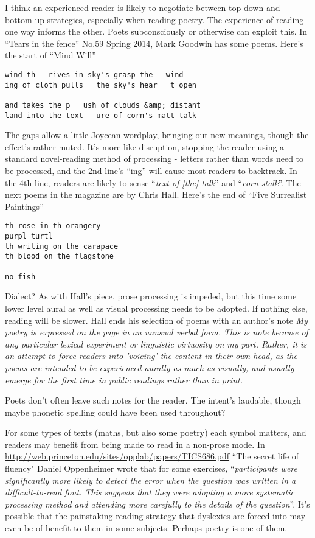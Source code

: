 \documentclass[11pt]{article}
\begin{document}
I think an experienced reader is likely to negotiate between top-down and bottom-up strategies, especially when reading poetry. The experience of reading one way informs the other. Poets subconsciously or otherwise can exploit this. In ``Tears in the fence'' No.59 Spring 2014, Mark Goodwin has some poems. Here's the start of ``Mind Will''
\begin{verbatim}
wind th   rives in sky's grasp the   wind
ing of cloth pulls   the sky's hear   t open

and takes the p   ush of clouds &amp; distant
land into the text   ure of corn's matt talk
\end{verbatim}

The gaps allow a little Joycean wordplay, bringing out new meanings, though the effect's rather muted. It's more like disruption, stopping the reader using a standard novel-reading method of processing - letters rather than words need to be processed, and the 2nd line's ``ing'' will cause most readers to backtrack. In the 4th line, readers are likely to sense ``\textit{text of [the] talk}'' and ``\textit{corn stalk}''. The next poems in the magazine are by Chris Hall. Here's the end of ``Five Surrealist Paintings''
\begin{verbatim}
th rose in th orangery
purpl turtl
th writing on the carapace
th blood on the flagstone

no fish
\end{verbatim}

Dialect? As with Hall's piece, prose processing is impeded, but this time some lower level aural as well as visual processing needs to be adopted. If nothing else, reading will be slower. Hall ends his selection of poems with an author's note
\textit{My poetry is expressed on the page in an unusual verbal form. This is note because of any particular lexical experiment or linguistic virtuosity on my part. Rather, it is an attempt to force readers into 'voicing' the content in their own head, as the poems are intended to be experienced aurally as much as visually, and usually emerge for the first time in public readings rather than in print.}

Poets don't often leave such notes for the reader. The intent's laudable, though maybe phonetic spelling could have been used throughout?


For some types of texts (maths, but also some poetry) each symbol matters, and readers may benefit from being made to read in a non-prose mode. In \url{http://web.princeton.edu/sites/opplab/papers/TICS686.pdf} ``The secret life of fluency" Daniel Oppenheimer wrote that for some exercises, ``\textit{participants were significantly more likely to detect the error when the question was written in a difficult-to-read font. This suggests that they were adopting a more systematic processing method and attending more carefully to the details of the question}''. It's possible that the painstaking reading strategy that dyslexics are forced into may even be of benefit to them in some subjects. Perhaps poetry is one of them.
\end{document}
